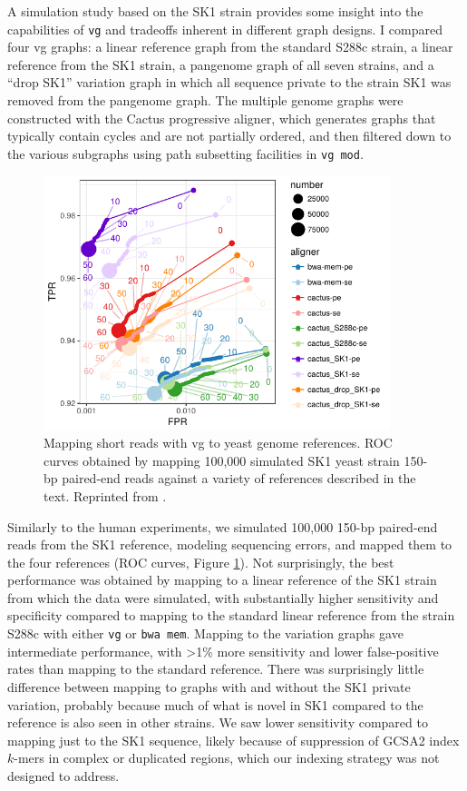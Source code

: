 A simulation study based on the SK1 strain provides some insight into the capabilities of {\tt vg} and tradeoffs inherent in different graph designs.
I compared four vg graphs: a linear reference graph from the standard S288c strain, a linear reference from the SK1 strain, a pangenome graph of all seven strains, and a ``drop SK1'' variation graph in which all sequence private to the strain SK1 was removed from the pangenome graph.
The multiple genome graphs were constructed with the Cactus progressive aligner, which generates graphs that typically contain cycles and are not partially ordered, and then filtered down to the various subgraphs using path subsetting facilities in {\tt vg mod}.

\begin{figure}[htbp!]
  \centering
  \includegraphics[width=0.9\textwidth]{Chapter3/Figs/e68fc338_test_sim_yeast_cactus-roc.pdf}
  \caption[Cactus yeast simulation]{Mapping short reads with vg to yeast genome references.
    ROC curves obtained by mapping 100,000 simulated SK1 yeast strain 150-bp paired-end reads against a variety of references described in the text.
    Reprinted from \cite{garrison2018variation}.}
  \label{fig:cactus_yeast_sim}
\end{figure}


Similarly to the human experiments, we simulated 100,000 150-bp paired-end reads from the SK1 reference, modeling sequencing errors, and mapped them to the four references (ROC curves, Figure \ref{fig:cactus_yeast_sim}).
Not surprisingly, the best performance was obtained by mapping to a linear reference of the SK1 strain from which the data were simulated, with substantially higher sensitivity and specificity compared to mapping to the standard linear reference from the strain S288c with either {\tt vg} or {\tt bwa mem}.
Mapping to the variation graphs gave intermediate performance, with >1\% more sensitivity and lower false-positive rates than mapping to the standard reference.
There was surprisingly little difference between mapping to graphs with and without the SK1 private variation, probably because much of what is novel in SK1 compared to the reference is also seen in other strains.
We saw lower sensitivity compared to mapping just to the SK1 sequence, likely because of suppression of GCSA2 index $k$-mers in complex or duplicated regions, which our indexing strategy was not designed to address.

